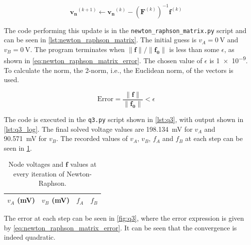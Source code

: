 \documentclass[a4paper,titlepage]{article}
\newcommand{\code}[1]{\texttt{#1}}
\begin{document}
	\begin{equation} \label{eq:newton_raphson_matrix}
		\mathbf{v_n}^{(k + 1)} \leftarrow \mathbf{v_n}^{(k)} - (\mathbf{F}^{(k)})^{-1} \mathbf{f}^{(k)}
	\end{equation}
	
	The code performing this update is in the \code{newton\_raphson\_matrix.py} script and can be seen in \cref{lst:newton_raphson_matrix}. The initial guess is $v_A=\SI{0}{\volt}$ and $v_B=\SI{0}{\volt}$. The program terminates when $\|\mathbf{f}\| / \|\mathbf{f_0}\|$ is less than some $\epsilon$, as shown in \cref{eq:newton_raphson_matrix_error}. The chosen value of $\epsilon$ is \SI{1e-9}{}. To calculate the norm, the 2-norm, i.e., the Euclidean norm, of the vectors is used.
	
	\begin{equation} \label{eq:newton_raphson_matrix_error}
		\text{Error} = \frac{\|\mathbf{f}\|}{\|\mathbf{f_0}\|} < \epsilon
	\end{equation}
	
	The code is executed in the \code{q3.py} script shown in \cref{lst:q3}, with output shown in \cref{lst:q3_log}. The final solved voltage values are \SI{198.134}{\milli\volt} for $v_A$ and \SI{90.571}{\milli\volt} for $v_B$. The recorded values of $v_A$, $v_B$, $f_A$ and $f_B$ at each step can be seen in \cref{table:q3}.
	
	\begin{table}[!htb] \footnotesize
		\centering
		\caption{Node voltages and $\mathbf{f}$ values at every iteration of Newton-Raphson.}
		\begin{tabular}{c|c|c|c}
			$v_A$ (mV) & $v_B$ (mV) & $f_A$ & $f_B$ \\ \hline
			
		\end{tabular}
		\label{table:q3}
	\end{table}

	The error at each step can be seen in \cref{fig:q3}, where the error expression is given by \cref{eq:newton_raphson_matrix_error}. It can be seen that the convergence is indeed quadratic.
\end{document}
